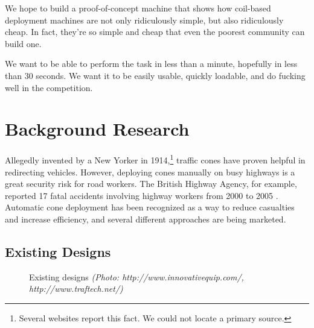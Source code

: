 \documentclass[11pt]{report}
\newcommand{\credit}[1]{\textit{(Photo: #1)}}
\begin{document}
We hope to build a proof-of-concept machine that shows how coil-based deployment machines are not only ridiculously simple, but also ridiculously cheap. In fact, they're so simple and cheap that even the poorest community can build one.

We want to be able to perform the task in less than a minute, hopefully in less than 30 seconds. We want it to be easily usable, quickly loadable, and do fucking well in the competition.

\section{Background Research}

Allegedly invented by a New Yorker in 1914,\footnote{Several websites report this fact. We could not locate a primary source.} traffic cones have proven helpful in redirecting vehicles. However, deploying cones manually on busy highways is a great security risk for road workers. The British Highway Agency, for example, reported 17 fatal accidents involving highway workers from 2000 to 2005 \cite{HTMA-Casualties}. Automatic cone deployment has been recognized as a way to reduce casualties and increase efficiency, and several different approaches are being marketed.

\subsection{Existing Designs}

\begin{figure}
  \centering
  \hspace{20pt}                
   \caption{Existing designs \credit{http://www.innovativequip.com/, http://www.traftech.net/}}
  \label{fig:animals}
\end{figure}
\end{document}
